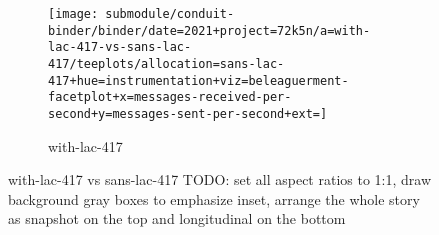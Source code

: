 \begin{figure*}[h]
    \begin{subfigure}[b]{\textwidth}
      \centering
      \texttt{[image: submodule/conduit-binder/binder/date=2021+project=72k5n/a=with-lac-417-vs-sans-lac-417/teeplots/allocation=sans-lac-417+hue=instrumentation+viz=beleaguerment-facetplot+x=messages-received-per-second+y=messages-sent-per-second+ext=]}
      \caption{with-lac-417}
      \label{fig:TODO}
    \end{subfigure}

    \caption{with-lac-417 vs sans-lac-417 TODO: set all aspect ratios to 1:1, draw background gray boxes to emphasize inset, arrange the whole story as snapshot on the top and longitudinal on the bottom}
    \label{fig:with-lac-417-vs-sans-lac-417-summary}
  \end{figure*}
